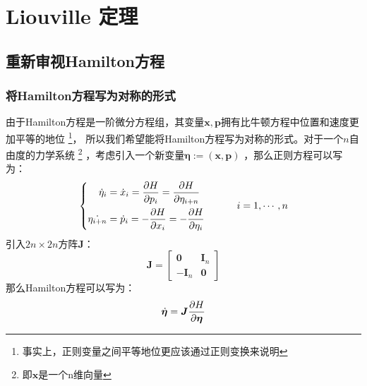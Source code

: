 \chapter{Liouville 定理}
    \section{重新审视Hamilton方程}
    \subsection{将Hamilton方程写为对称的形式}
    由于Hamilton方程是一阶微分方程组，其变量$\bm{x},\bm{p}$拥有比牛顿方程中位置和速度更加平等的地位
    \footnote{事实上，正则变量之间平等地位更应该通过正则变换\cite{Goldstein2000Classical}来说明}，
    所以我们希望能将Hamilton方程写为对称的形式。对于一个$n$自由度的力学系统
    \footnote{
        即$\bm{x}$是一个n维向量
    }
    ，考虑引入一个新变量$\bm{\eta}:= (\bm{x}, \bm{p})$
    ，那么正则方程可以写为：
    \begin{equation}
        \left\{
        \begin{split}
            \dot{\eta}_{i} &= \dot{x}_i = \frac{\partial{H}}{\partial{p_i}} = \frac{\partial{H}}{\partial{\eta_{i+n}}}\\
            \dot{\eta_{i+n}} &= \dot{p}_i = - \frac{\partial{H}}{\partial{x_i}} = -\frac{\partial{H}}{\partial{\eta_{i}}}
        \end{split}
        \right.
        \quad\quad\quad i = 1,\cdots, n
    \end{equation}
    引入$2n\times 2n$方阵$\bm{J}$：
    \begin{equation}
        \bm{J} = 
        \begin{bmatrix}
            \bm{0} & \bm{I}_n\\
            -\bm{I}_n & \bm{0}
        \end{bmatrix}
    \end{equation}
    那么Hamilton方程可以写为：
    \begin{equation}
        \dot{\bm{\eta}} = \bm{J}\frac{\partial{H}}{\partial{\bm{\eta}}}
    \end{equation}
